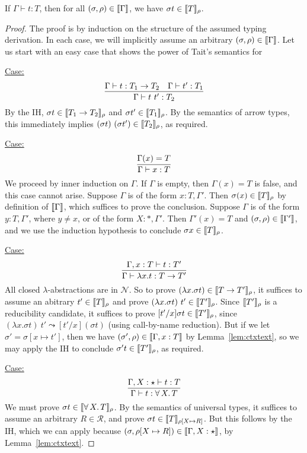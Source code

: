 \documentclass{article}
\begin{document}
\begin{theorem}
\label{thm:snd}
If $\Gamma\vdash t : T$, then for all $(\sigma,\rho)\in\llbracket \Gamma \rrbracket$, we have $\sigma t \in\llbracket T \rrbracket_\rho$.
\end{theorem}
\begin{proof}
The proof is by induction on the structure of the assumed typing derivation.
In each case, we will implicitly assume an arbitrary $(\sigma,\rho)\in\llbracket \Gamma \rrbracket$.
Let us start with an easy case that shows the power of Tait's semantics for 

\underline{Case:}
\[
\infer{\Gamma \vdash t\ t' : T_2}{\Gamma \vdash t : T_1 \to T_2 & \Gamma \vdash t' : T_1} 
\]
By the IH, $\sigma t\in\llbracket T_1 \to T_2 \rrbracket_\rho$ and $\sigma
t'\in\llbracket T_1 \rrbracket_\rho$.  By the semantics of arrow types, this
immediately implies $(\sigma t)\ (\sigma t')\in\llbracket T_2 \rrbracket_\rho$, as
required.



\underline{Case:}
\[
\infer{\Gamma \vdash x : T}{\Gamma(x) = T}
\]
We proceed by inner induction on $\Gamma$.  If $\Gamma$ is empty, then
$\Gamma(x) = T$ is false, and this case cannot arise.  Suppose
$\Gamma$ is of the form $x:T, \Gamma'$.  Then
$\sigma(x)\in\llbracket T \rrbracket_\rho$ by definition of $\llbracket \Gamma \rrbracket$,
which suffices to prove the conclusion.  Suppose $\Gamma$ is of the
form $y:T, \Gamma'$, where $y\neq x$, or of the form $X:*,\Gamma'$.
Then $\Gamma'(x) = T$ and $(\sigma,\rho)\in\llbracket \Gamma' \rrbracket$, and we
use the induction hypothesis to conclude $\sigma x\in\llbracket T \rrbracket_\rho$.

\underline{Case:}
\[
\infer{\Gamma \vdash \lambda x . t : T \to T'}{\Gamma, x : T \vdash t : T'} 
\]
All closed $\lambda$-abstractions are in $\mathcal{N}$.  So to prove $(\lambda x.\sigma t) \in \llbracket T\to T' \rrbracket_\rho$, it suffices
to assume an abitrary $t'\in\llbracket T \rrbracket_\rho$ and prove $(\lambda
x.\sigma t)\ t'\in\llbracket T' \rrbracket_\rho$.  Since $\llbracket T' \rrbracket_\rho$ is a
reducibility candidate, it suffices to prove $[t'/x]\sigma
t\in\llbracket T' \rrbracket_\rho$, since $(\lambda x.\sigma t)\ t' \leadsto
[t'/x](\sigma t)$ (using call-by-name reduction).  But if we let $\sigma'=\sigma[x\mapsto t']$, then
we have $(\sigma',\rho)\in\llbracket \Gamma,x:T \rrbracket$ by
Lemma~\ref{lem:ctxtext}, so we may apply the IH to conclude $\sigma'
t\in\llbracket T' \rrbracket_\rho$, as required.

\underline{Case:}
\[
\infer{\Gamma \vdash t : \forall\, X.\,T}{\Gamma,X : \star \vdash t : T} 
\]
We must prove $\sigma t\in\llbracket \forall\, X.\,T \rrbracket_\rho$.  By the
semantics of universal types, it suffices to assume an arbitrary
$R\in\mathcal{R}$, and prove $\sigma t\in\llbracket T \rrbracket_{\rho[X\mapsto
  R]}$.  But this follows by the IH, which we can apply because
$(\sigma,\rho[X\mapsto R])\in\llbracket \Gamma, X:\star \rrbracket$, by
Lemma~\ref{lem:ctxtext}.


\end{proof}
\end{document}
